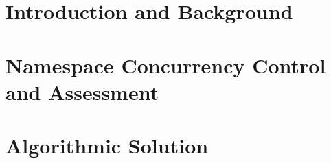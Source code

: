 \documentclass[a4paper,11pt,twoside,onecolumn,final,openright]{book}
\begin{document}


\pagestyle{headings}




\part{Introduction and Background}
\thispagestyle{empty}
\thispagestyle{empty}

\newpage
\thispagestyle{empty}


     


\part{Namespace Concurrency Control and Assessment}
\thispagestyle{empty}
\thispagestyle{empty}

\newpage
\thispagestyle{empty}





\part{Algorithmic Solution}
\thispagestyle{empty}
\thispagestyle{empty}
\end{document}
